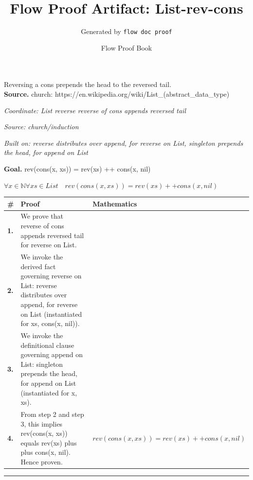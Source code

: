 \documentclass[11pt]{article}
\title{Flow Proof Artifact: List-rev-cons}
\author{Generated by \texttt{flow doc proof}}
\date{Flow Proof Book}
\theoremstyle{definition}
\begin{document}
\maketitle
Reversing a cons prepends the head to the reversed tail.\\[0.5em]
\textbf{Source.} church: https://en.wikipedia.org/wiki/List\_(abstract\_data\_type)\\[0.5em]
\bigskip
{}\par
\smallskip\noindent\textit{Coordinate: List \cdot reverse \cdot reverse of cons appends reversed tail}\par
\smallskip\noindent\textit{Source: church/induction}\par
\smallskip\noindent\textit{Built on: reverse distributes over append, for reverse on List, singleton prepends the head, for append on List}\par
\medskip
\noindent\textbf{Goal.} rev(cons(x, xs)) = rev(xs) ++ cons(x, nil)\par
\noindent$\displaystyle \forall x \in \mathbb{N} \forall xs \in List\quad rev(cons(x, xs)) = rev(xs) ++ cons(x, nil)$\par
\medskip
\noindent
\begin{tabular}{@{} >{\raggedright\arraybackslash}p{} >{\raggedright\arraybackslash}p{} >{\raggedleft\arraybackslash}p{} @{}}
\textbf{\#} & \textbf{Proof} & \textbf{Mathematics} \\
\midrule
\textbf{1.} & We prove that reverse of cons appends reversed tail for reverse on List. & \\[0.45em]
\textbf{2.} & We invoke the derived fact governing reverse on List: reverse distributes over append, for reverse on List (instantiated for xs, cons(x, nil)). & \\[0.45em]
\textbf{3.} & We invoke the definitional clause governing append on List: singleton prepends the head, for append on List (instantiated for x, xs). & \\[0.45em]
\textbf{4.} & From step 2 and step 3, this implies rev(cons(x, xs)) equals rev(xs) plus plus cons(x, nil). Hence proven. & $\displaystyle rev(cons(x, xs)) = rev(xs) ++ cons(x, nil)$ \\[0.45em]
\bottomrule
\end{tabular}
\label{thm:List-reverse-reverse_of_cons_appends_reversed_tail}
\par\medskip\hrule
\end{document}
